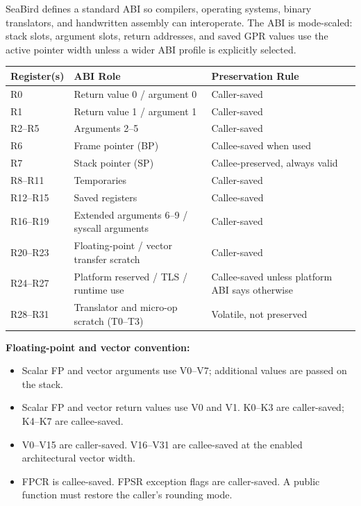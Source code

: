 \documentclass[11pt]{article}
\begin{document}
SeaBird defines a standard ABI so compilers, operating systems, binary translators, and handwritten assembly can interoperate. The ABI is mode-scaled: stack slots, argument slots, return addresses, and saved GPR values use the active pointer width unless a wider ABI profile is explicitly selected.

\begin{table}[h]
\centering
\begin{tabular}{@{}L{2.4cm}L{5.4cm}L{4.0cm}@{}}
\toprule
\textbf{Register(s)} & \textbf{ABI Role} & \textbf{Preservation Rule} \\ \midrule
R0 & Return value 0 / argument 0 & Caller-saved \\
R1 & Return value 1 / argument 1 & Caller-saved \\
R2--R5 & Arguments 2--5 & Caller-saved \\
R6 & Frame pointer (BP) & Callee-saved when used \\
R7 & Stack pointer (SP) & Callee-preserved, always valid \\
R8--R11 & Temporaries & Caller-saved \\
R12--R15 & Saved registers & Callee-saved \\
R16--R19 & Extended arguments 6--9 / syscall arguments & Caller-saved \\
R20--R23 & Floating-point / vector transfer scratch & Caller-saved \\
R24--R27 & Platform reserved / TLS / runtime use & Callee-saved unless platform ABI says otherwise \\
R28--R31 & Translator and micro-op scratch (T0--T3) & Volatile, not preserved \\\bottomrule
\end{tabular}
\end{table}

\textbf{Floating-point and vector convention:}
\begin{itemize}
    \item Scalar FP and vector arguments use V0--V7; additional values are passed on the stack.
    \item Scalar FP and vector return values use V0 and V1. K0--K3 are caller-saved; K4--K7 are callee-saved.
    \item V0--V15 are caller-saved. V16--V31 are callee-saved at the enabled architectural vector width.
    \item FPCR is callee-saved. FPSR exception flags are caller-saved. A public function must restore the caller's rounding mode.
\end{itemize}
\end{document}
